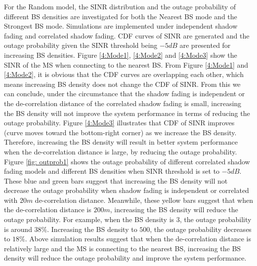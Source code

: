 \par For the Random model, the SINR distribution and the outage probability of different BS densities are investigated for both the Nearest BS mode and the Strongest BS mode. Simulations are implemented under independent shadow fading and correlated shadow fading. CDF curves of SINR are generated and the outage probability given the SINR threshold being $-5dB$ are presented for increasing BS densities. Figure \ref{4:Mode1}, \ref{4:Mode2} and \ref{4:Mode3} show the SINR of the MS when connecting to the nearest BS. From Figure \ref{4:Mode1} and \ref{4:Mode2}, it is obvious that the CDF curves are overlapping each other, which means increasing BS density does not change the CDF of SINR. From this we can conclude, under the circumstance that the shadow fading is independent or the de-correlation distance of the correlated shadow fading is small, increasing the BS density will not improve the system performance in terms of reducing the outage probability. Figure \ref{4:Mode3}  illustrates that CDF of SINR improves (curve moves toward the bottom-right corner) as we increase the BS density. Therefore, increasing the BS density will result in better system performance when the de-correlation distance is large, by reducing the outage probability. Figure \ref{fig: outprob1} shows the outage probability of different correlated shadow fading models and different BS densities when SINR threshold is set to $-5dB$. These blue and green bars suggest that increasing the BS density will not decrease the outage probability when shadow fading is independent or correlated with $20m$ de-correlation distance. Meanwhile, these yellow bars suggest that when the de-correlation distance is $200m$, increasing the BS density will reduce the outage probability. For example, when the BS density is $3$, the outage probability is around $38\%$. Increasing the BS density to $500$, the outage probability decreases to $18\%$. Above simulation results suggest that when the de-correlation distance is relatively large and the MS is connecting to the nearest BS, increasing the BS density will reduce the outage probability and improve the system performance.



